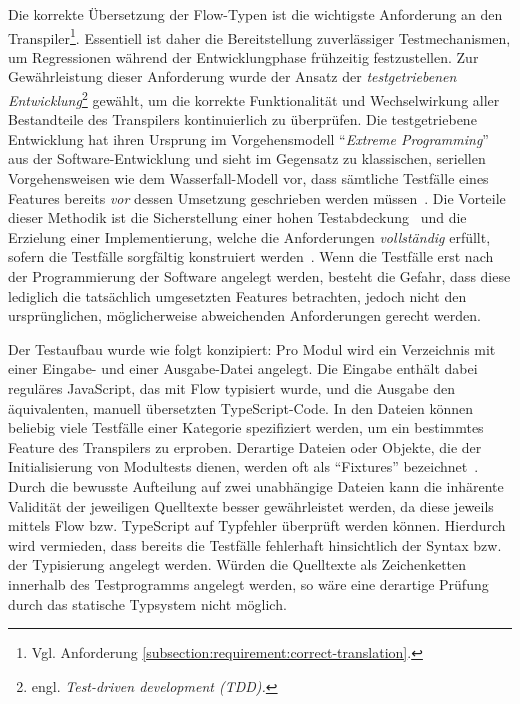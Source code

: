 Die korrekte Übersetzung der Flow-Typen ist die wichtigste Anforderung an den Transpiler\footnote{Vgl. Anforderung \ref{subsection:requirement:correct-translation}.}. Essentiell ist daher die Bereitstellung zuverlässiger Testmechanismen, um Regressionen während der Entwicklungphase frühzeitig festzustellen. Zur Gewährleistung dieser Anforderung wurde der Ansatz der \emph{testgetriebenen Entwicklung}\footnote{engl. \textit{Test-driven development (TDD).}} gewählt, um die korrekte Funktionalität und Wechselwirkung aller Bestandteile des Transpilers kontinuierlich zu überprüfen. Die testgetriebene Entwicklung hat ihren Ursprung im Vorgehensmodell \enquote{\textit{Extreme Programming}}~\autocite{JEFFRIES:EXTREME_PROGRAMMING} aus der Software-Entwicklung und sieht im Gegensatz zu klassischen, seriellen Vorgehensweisen wie dem Wasserfall-Modell vor, dass sämtliche Testfälle eines Features bereits \emph{vor} dessen Umsetzung geschrieben werden müssen~\autocite{BECK:EXTREME_PROGRAMMING}. Die Vorteile dieser Methodik ist die Sicherstellung einer hohen Testabdeckung~\autocite[90]{BECK:TDD} und die Erzielung einer Implementierung, welche die Anforderungen \emph{vollständig} erfüllt, sofern die Testfälle sorgfältig konstruiert werden~\autocite[214]{BECK:TDD}. Wenn die Testfälle erst nach der Programmierung der Software angelegt werden, besteht die Gefahr, dass diese lediglich die tatsächlich umgesetzten Features betrachten, jedoch nicht den ursprünglichen, möglicherweise abweichenden Anforderungen gerecht werden.

Der Testaufbau wurde wie folgt konzipiert: Pro Modul wird ein Verzeichnis mit einer Ein\-gabe- und einer Ausgabe-Datei angelegt. Die Eingabe enthält dabei reguläres JavaScript, das mit Flow typisiert wurde, und die Ausgabe den äquivalenten, manuell übersetzten TypeScript-Code. In den Dateien können beliebig viele Testfälle einer Kategorie spezifiziert werden, um ein bestimmtes Feature des Transpilers zu erproben. Derartige Dateien oder Objekte, die der Initialisierung von Modultests dienen, werden oft als \enquote{Fixtures} bezeichnet~\autocite{OLAN:2003}. Durch die bewusste Aufteilung auf zwei unabhängige Dateien kann die inhärente Validität der jeweiligen Quelltexte besser gewährleistet werden, da diese jeweils mittels Flow bzw. TypeScript auf Typfehler überprüft werden können. Hierdurch wird vermieden, dass bereits die Testfälle fehlerhaft hinsichtlich der Syntax bzw. der Typisierung angelegt werden. Würden die Quelltexte als Zeichenketten innerhalb des Testprogramms angelegt werden, so wäre eine derartige Prüfung durch das statische Typsystem nicht möglich.

